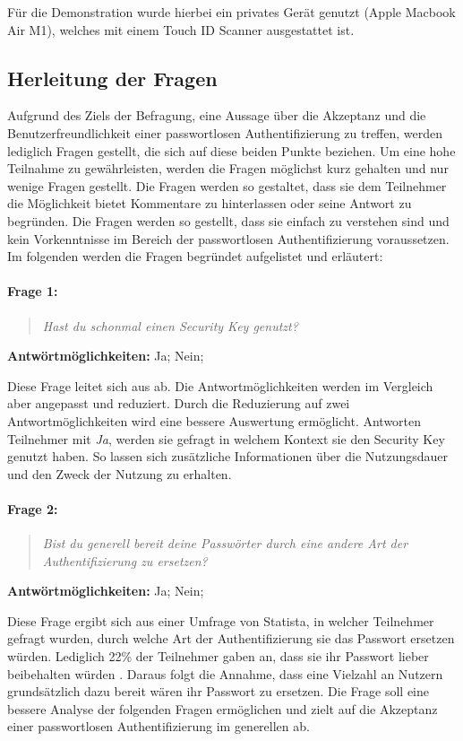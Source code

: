 Für die Demonstration wurde hierbei ein privates Gerät genutzt (Apple Macbook Air M1), welches mit einem Touch ID Scanner ausgestattet ist.


\subsection{Herleitung der Fragen} \label{questions}
Aufgrund des Ziels der Befragung, eine Aussage über die Akzeptanz und die Benutzerfreundlichkeit einer passwortlosen Authentifizierung zu treffen, werden lediglich Fragen gestellt, die sich auf diese beiden Punkte beziehen. Um eine hohe Teilnahme zu gewährleisten, werden die Fragen möglichst kurz gehalten und nur wenige Fragen gestellt. Die Fragen werden so gestaltet, dass sie dem Teilnehmer die Möglichkeit bietet Kommentare zu hinterlassen oder seine Antwort zu begründen. Die Fragen werden so gestellt, dass sie einfach zu verstehen sind und kein Vorkenntnisse im Bereich der passwortlosen Authentifizierung voraussetzen. Im folgenden werden die Fragen begründet aufgelistet und erläutert:

\paragraph{Frage 1:}

\begin{quote}
    \textit{Hast du schonmal einen Security Key genutzt?}
\end{quote}
\textbf{Antwörtmöglichkeiten:} Ja; Nein; 

Diese Frage leitet sich aus \cite{farke2020you} ab. Die Antwortmöglichkeiten werden im Vergleich aber angepasst und reduziert. Durch die Reduzierung auf zwei Antwortmöglichkeiten wird eine bessere Auswertung ermöglicht. Antworten Teilnehmer mit \textit{Ja}, werden sie gefragt in welchem Kontext sie den Security Key genutzt haben. So lassen sich zusätzliche Informationen über die Nutzungsdauer und den Zweck der Nutzung zu erhalten.

\paragraph{Frage 2:}

\begin{quote}
    \textit{Bist du generell bereit deine Passwörter durch eine andere Art der Authentifizierung zu ersetzen?}
\end{quote}
\textbf{Antwörtmöglichkeiten:} Ja; Nein; 

Diese Frage ergibt sich aus einer Umfrage von Statista, in welcher Teilnehmer gefragt wurden, durch welche Art der Authentifizierung sie das Passwort ersetzen würden. Lediglich 22\% der Teilnehmer gaben an, dass sie ihr Passwort lieber beibehalten würden \cite{techstat}. Daraus folgt die Annahme, dass eine Vielzahl an Nutzern grundsätzlich dazu bereit wären ihr Passwort zu ersetzen. Die Frage soll eine bessere Analyse der folgenden Fragen ermöglichen und zielt auf die Akzeptanz einer passwortlosen Authentifizierung im generellen ab.

